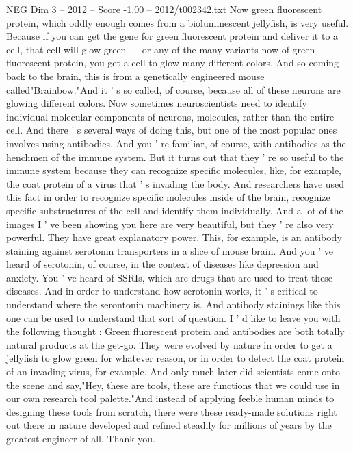 \begin{textsample}{NEG Dim 3 – 2012 – Score -1.00 – 2012/t002342.txt}
Now green fluorescent protein, which oddly enough comes from a bioluminescent jellyfish, is very useful.
Because if you can get the gene for green fluorescent protein and deliver it to a cell, that cell will glow green — or any of the many variants now of green fluorescent protein, you get a cell to glow many different colors.
And so coming back to the brain, this is from a genetically engineered mouse called"Brainbow."And it ' s so called, of course, because all of these neurons are glowing different colors.
Now sometimes neuroscientists need to identify individual molecular components of neurons, molecules, rather than the entire cell.
And there ' s several ways of doing this, but one of the most popular ones involves using antibodies.
And you ' re familiar, of course, with antibodies as the henchmen of the immune system.
But it turns out that they ' re so useful to the immune system because they can recognize specific molecules, like, for example, the coat protein of a virus that ' s invading the body.
And researchers have used this fact in order to recognize specific molecules inside of the brain, recognize specific substructures of the cell and identify them individually.
And a lot of the images I ' ve been showing you here are very beautiful, but they ' re also very powerful.
They have great explanatory power.
This, for example, is an antibody staining against serotonin transporters in a slice of mouse brain.
And you ' ve heard of serotonin, of course, in the context of diseases like depression and anxiety.
You ' ve heard of SSRIs, which are drugs that are used to treat these diseases.
And in order to understand how serotonin works, it ' s critical to understand where the serontonin machinery is.
And antibody stainings like this one can be used to understand that sort of question.
I ' d like to leave you with the following thought : Green fluorescent protein and antibodies are both totally natural products at the get-go.
They were evolved by nature in order to get a jellyfish to glow green for whatever reason, or in order to detect the coat protein of an invading virus, for example.
And only much later did scientists come onto the scene and say,"Hey, these are tools, these are functions that we could use in our own research tool palette."And instead of applying feeble human minds to designing these tools from scratch, there were these ready-made solutions right out there in nature developed and refined steadily for millions of years by the greatest engineer of all.
Thank you.

\end{textsample}
